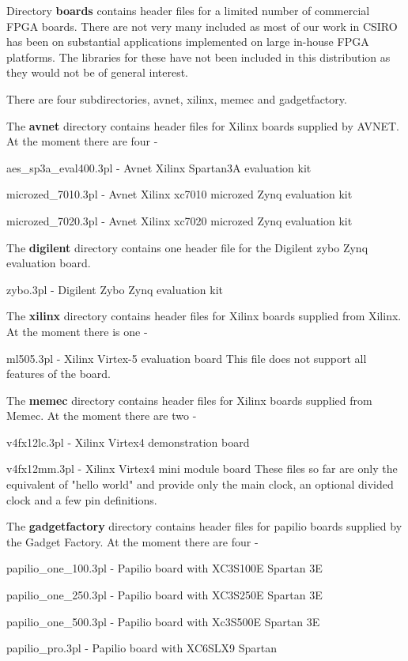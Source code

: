     Directory {\bf boards} contains header files for a limited number of
    commercial FPGA boards. There are not very many included as most of our work
    in CSIRO has been on substantial applications implemented on large in-house
    FPGA platforms. The libraries for these have not been included in this
    distribution as they would not be of general interest.

    There are four subdirectories, avnet, xilinx, memec and gadgetfactory.
    
    The {\bf avnet} directory contains header files for Xilinx boards supplied
    by AVNET. At the moment there are four -
    \blist
    \item   aes\_sp3a\_eval400.3pl - Avnet Xilinx Spartan3A evaluation kit
    \item   microzed\_7010.3pl - Avnet Xilinx xc7010 microzed Zynq evaluation kit
    \item   microzed\_7020.3pl - Avnet Xilinx xc7020 microzed Zynq evaluation kit
    \blend

    The {\bf digilent} directory contains one header file for the Digilent zybo
    Zynq evaluation board.
    \blist
    \item   zybo.3pl - Digilent Zybo Zynq evaluation kit
    \blend
    
    The {\bf xilinx} directory contains header files for Xilinx boards supplied
    from Xilinx. At the moment there is one -
    \blist
    \item   ml505.3pl - Xilinx Virtex-5 evaluation board
    \blend
    This file does not support all features of the board.
    
    The {\bf memec} directory contains header files for Xilinx boards supplied
    from Memec. At the moment there are two -
    
    \blist
    \item   v4fx12lc.3pl - Xilinx Virtex4 demonstration board
    \item   v4fx12mm.3pl - Xilinx Virtex4 mini module board
    \blend
    These files so far are only the equivalent of "hello world" and provide
    only the main clock, an optional divided clock and a few pin definitions.

    The {\bf gadgetfactory} directory contains header files for papilio boards
    supplied by the Gadget Factory. At the moment there are four -
    
    \blist
    \item   papilio\_one\_100.3pl - Papilio board with XC3S100E Spartan 3E
    \item   papilio\_one\_250.3pl - Papilio board with XC3S250E Spartan 3E
    \item   papilio\_one\_500.3pl - Papilio board with Xc3S500E Spartan 3E
    \item   papilio\_pro.3pl - Papilio board with XC6SLX9 Spartan
    \blend


